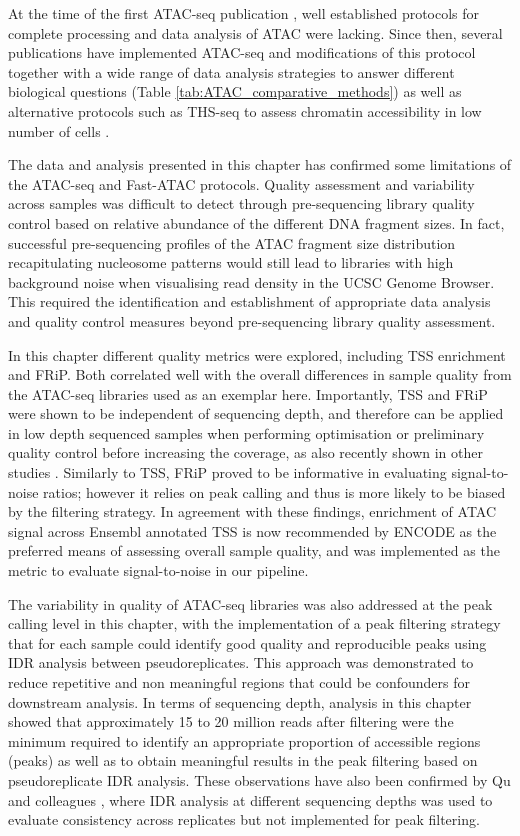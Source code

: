 At the time of the first ATAC-seq publication \parencite{Buenrostro2013}, well established protocols for complete processing and data analysis of ATAC were lacking. Since then, several publications have implemented ATAC-seq and modifications of this protocol together with a wide range of data analysis strategies to answer different biological questions (Table \ref{tab:ATAC_comparative_methods}) as well as alternative protocols such as THS-seq to assess chromatin accessibility in low number of cells \parencite{Sos2016}.

The data and analysis presented in this chapter has confirmed some limitations of the ATAC-seq and Fast-ATAC protocols. Quality assessment and variability across samples was difficult to detect through pre-sequencing library quality control based on relative abundance of the different DNA fragment sizes. In fact, successful pre-sequencing profiles of the ATAC fragment size distribution recapitulating nucleosome patterns would still lead to libraries with high background noise when visualising read density in the UCSC Genome Browser. This required the identification and establishment of appropriate data analysis and quality control measures beyond pre-sequencing library quality assessment.

In this chapter different quality metrics were explored, including TSS enrichment and FRiP. Both correlated well with the overall differences in sample quality from the ATAC-seq libraries used as an exemplar here. Importantly, TSS and FRiP were shown to be independent of sequencing depth, and therefore can be applied in low depth sequenced samples when performing optimisation or preliminary quality control before increasing the coverage, as also recently shown in other studies \parencite{Corces2017}. Similarly to TSS, FRiP proved to be informative in evaluating signal-to-noise ratios; however it relies on peak calling and thus is more likely to be biased by the filtering strategy. In agreement with these findings, enrichment of ATAC signal across Ensembl annotated TSS is now recommended by ENCODE as the preferred means of assessing overall sample quality, and was implemented as the metric to evaluate signal-to-noise in our pipeline. 

The variability in quality of ATAC-seq libraries was also addressed at the peak calling level in this chapter, with the implementation of a peak filtering strategy that for each sample could identify good quality and reproducible peaks using IDR analysis between pseudoreplicates. This approach was demonstrated to reduce  repetitive and non meaningful regions that could be confounders for downstream analysis. In terms of sequencing depth, analysis in this chapter showed that approximately 15 to 20 million reads after filtering were the minimum required to identify an appropriate proportion of accessible regions (peaks) as well as to obtain meaningful results in the peak filtering based on pseudoreplicate IDR analysis. These observations have also been confirmed by Qu and colleagues \parencite{Qu2015}, where IDR analysis at different sequencing depths was used to evaluate consistency across replicates but not implemented for peak filtering.

